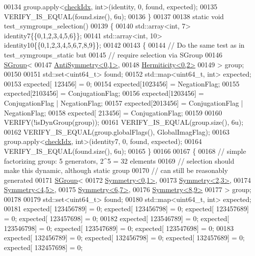 \begin{DoxyCode}
00134   group.apply<\hyperlink{structcheck_idx}{checkIdx}, \textcolor{keywordtype}{int}>(identity, 0, found, expected);
00135   VERIFY\_IS\_EQUAL(found.size(), 6u);
00136 \}
00137 
00138 \textcolor{keyword}{static} \textcolor{keywordtype}{void} test\_symgroups\_selection()
00139 \{
00140   std::array<int, 7> identity7\{\{0,1,2,3,4,5,6\}\};
00141   std::array<int, 10> identity10\{\{0,1,2,3,4,5,6,7,8,9\}\};
00142 
00143   \{
00144     \textcolor{comment}{// Do the same test as in test\_symgroups\_static but}
00145     \textcolor{comment}{// require selection via SGroup}
00146     \hyperlink{class_eigen_1_1_s_group}{SGroup}<
00147       \hyperlink{struct_eigen_1_1_anti_symmetry}{AntiSymmetry<0,1>},
00148       \hyperlink{struct_eigen_1_1_hermiticity}{Hermiticity<0,2>}
00149     > group;
00150 
00151     std::set<uint64\_t> found;
00152     std::map<uint64\_t, int> expected;
00153     expected[ 123456] = 0;
00154     expected[1023456] = NegationFlag;
00155     expected[2103456] = ConjugationFlag;
00156     expected[1203456] = ConjugationFlag | NegationFlag;
00157     expected[2013456] = ConjugationFlag | NegationFlag;
00158     expected[ 213456] = ConjugationFlag;
00159 
00160     VERIFY(!isDynGroup(group));
00161     VERIFY\_IS\_EQUAL(group.size(), 6u);
00162     VERIFY\_IS\_EQUAL(group.globalFlags(), GlobalImagFlag);
00163     group.apply<\hyperlink{structcheck_idx}{checkIdx}, \textcolor{keywordtype}{int}>(identity7, 0, found, expected);
00164     VERIFY\_IS\_EQUAL(found.size(), 6u);
00165   \}
00166 
00167   \{
00168     \textcolor{comment}{// simple factorizing group: 5 generators, 2^5 = 32 elements}
00169     \textcolor{comment}{// selection should make this dynamic, although static group}
00170     \textcolor{comment}{// can still be reasonably generated}
00171     \hyperlink{class_eigen_1_1_s_group}{SGroup}<
00172       \hyperlink{struct_eigen_1_1_symmetry}{Symmetry<0,1>},
00173       \hyperlink{struct_eigen_1_1_symmetry}{Symmetry<2,3>},
00174       \hyperlink{struct_eigen_1_1_symmetry}{Symmetry<4,5>},
00175       \hyperlink{struct_eigen_1_1_symmetry}{Symmetry<6,7>},
00176       \hyperlink{struct_eigen_1_1_symmetry}{Symmetry<8,9>}
00177     > group;
00178 
00179     std::set<uint64\_t> found;
00180     std::map<uint64\_t, int> expected;
00181     expected[ 123456789] = 0; expected[ 123456798] = 0; expected[ 123457689] = 0; expected[ 123457698] = 0;
00182     expected[ 123546789] = 0; expected[ 123546798] = 0; expected[ 123547689] = 0; expected[ 123547698] = 0;
00183     expected[ 132456789] = 0; expected[ 132456798] = 0; expected[ 132457689] = 0; expected[ 132457698] = 0;

\end{DoxyCode}
